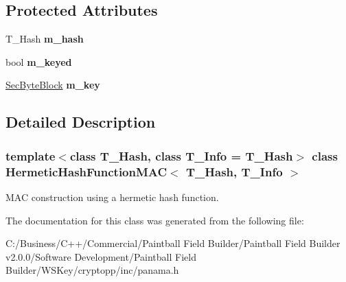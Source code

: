 \subsection*{Protected Attributes}
\begin{DoxyCompactItemize}
\item 
\hypertarget{class_hermetic_hash_function_m_a_c_a8dca76be12b470fb334a1367903e95bd}{
T\_\-Hash {\bfseries m\_\-hash}}
\label{class_hermetic_hash_function_m_a_c_a8dca76be12b470fb334a1367903e95bd}

\item 
\hypertarget{class_hermetic_hash_function_m_a_c_aba3c91a972c541ca6f52055ba3dc8bc7}{
bool {\bfseries m\_\-keyed}}
\label{class_hermetic_hash_function_m_a_c_aba3c91a972c541ca6f52055ba3dc8bc7}

\item 
\hypertarget{class_hermetic_hash_function_m_a_c_acc54bdc381eb96b75a8a30c99ef338dd}{
\hyperlink{class_sec_block}{SecByteBlock} {\bfseries m\_\-key}}
\label{class_hermetic_hash_function_m_a_c_acc54bdc381eb96b75a8a30c99ef338dd}

\end{DoxyCompactItemize}


\subsection{Detailed Description}
\subsubsection*{template$<$class T\_\-Hash, class T\_\-Info = T\_\-Hash$>$ class HermeticHashFunctionMAC$<$ T\_\-Hash, T\_\-Info $>$}

MAC construction using a hermetic hash function. 

The documentation for this class was generated from the following file:\begin{DoxyCompactItemize}
\item 
C:/Business/C++/Commercial/Paintball Field Builder/Paintball Field Builder v2.0.0/Software Development/Paintball Field Builder/WSKey/cryptopp/inc/panama.h\end{DoxyCompactItemize}
